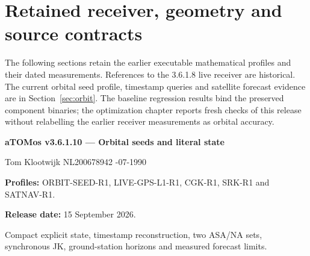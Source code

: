 \documentclass[11pt,a4paper]{article}
\begin{document}
\section*{Retained receiver, geometry and source contracts}
The following sections retain the earlier executable mathematical profiles and
their dated measurements. References to the 3.6.1.8 live receiver are historical.
The current orbital seed profile, timestamp queries and satellite forecast
evidence are in Section~\ref{sec:orbit}. The baseline regression results bind the preserved component binaries; the
optimization chapter reports fresh checks of this release without relabelling the earlier
receiver measurements as orbital accuracy.

\vfill\begin{panel}
\textbf{aTOMos v3.6.1.10 --- Orbital seeds and literal state}\par
Tom Klootwijk \quad NL200678942 -07-1990\par
\textbf{Profiles:} ORBIT-SEED-R1, LIVE-GPS-L1-R1, CGK-R1, SRK-R1 and SATNAV-R1.\par
\textbf{Release date:} 15 September 2026.\par
Compact explicit state, timestamp reconstruction, two ASA/NA sets, synchronous
JK, ground-station horizons and measured forecast limits.
\end{panel}
\end{document}
